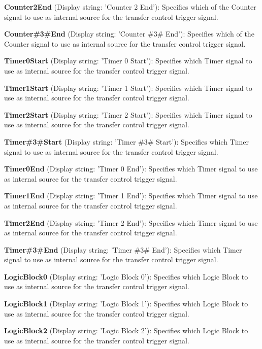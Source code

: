 \begin{DoxyItemize}
\item {\bfseries Counter2\+End} (Display string\+: 'Counter 2 End')\+: Specifies which of the Counter signal to use as internal source for the transfer control trigger signal.
\item {\bfseries Counter\#3\#End} (Display string\+: 'Counter \#3\# End')\+: Specifies which of the Counter signal to use as internal source for the transfer control trigger signal.
\item {\bfseries Timer0\+Start} (Display string\+: 'Timer 0 Start')\+: Specifies which Timer signal to use as internal source for the transfer control trigger signal.
\item {\bfseries Timer1\+Start} (Display string\+: 'Timer 1 Start')\+: Specifies which Timer signal to use as internal source for the transfer control trigger signal.
\item {\bfseries Timer2\+Start} (Display string\+: 'Timer 2 Start')\+: Specifies which Timer signal to use as internal source for the transfer control trigger signal.
\item {\bfseries Timer\#3\#Start} (Display string\+: 'Timer \#3\# Start')\+: Specifies which Timer signal to use as internal source for the transfer control trigger signal.
\item {\bfseries Timer0\+End} (Display string\+: 'Timer 0 End')\+: Specifies which Timer signal to use as internal source for the transfer control trigger signal.
\item {\bfseries Timer1\+End} (Display string\+: 'Timer 1 End')\+: Specifies which Timer signal to use as internal source for the transfer control trigger signal.
\item {\bfseries Timer2\+End} (Display string\+: 'Timer 2 End')\+: Specifies which Timer signal to use as internal source for the transfer control trigger signal.
\item {\bfseries Timer\#3\#End} (Display string\+: 'Timer \#3\# End')\+: Specifies which Timer signal to use as internal source for the transfer control trigger signal.
\item {\bfseries Logic\+Block0} (Display string\+: 'Logic Block 0')\+: Specifies which Logic Block to use as internal source for the transfer control trigger signal.
\item {\bfseries Logic\+Block1} (Display string\+: 'Logic Block 1')\+: Specifies which Logic Block to use as internal source for the transfer control trigger signal.
\item {\bfseries Logic\+Block2} (Display string\+: 'Logic Block 2')\+: Specifies which Logic Block to use as internal source for the transfer control trigger signal.

\end{DoxyItemize}
